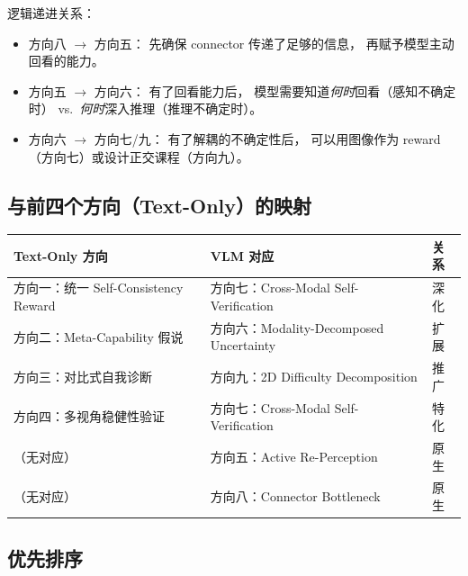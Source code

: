 \documentclass[12pt,a4paper]{article}
\begin{document}
\noindent
逻辑递进关系：
\begin{itemize}[leftmargin=2em]
  \item 方向八 $\rightarrow$ 方向五：
    先确保 connector 传递了足够的信息，
    再赋予模型主动回看的能力。
  \item 方向五 $\rightarrow$ 方向六：
    有了回看能力后，
    模型需要知道\textit{何时}回看（感知不确定时）
    vs.\ \textit{何时}深入推理（推理不确定时）。
  \item 方向六 $\rightarrow$ 方向七/九：
    有了解耦的不确定性后，
    可以用图像作为 reward（方向七）或设计正交课程（方向九）。
\end{itemize}

\subsection*{与前四个方向（Text-Only）的映射}

\begin{table}[h]
\centering
\small
\begin{tabular}{p{5cm}p{5.5cm}p{2cm}}
\toprule
\textbf{Text-Only 方向} & \textbf{VLM 对应} & \textbf{关系} \\
\midrule
方向一：统一 Self-Consistency Reward
  & 方向七：Cross-Modal Self-Verification
  & 深化 \\
方向二：Meta-Capability 假说
  & 方向六：Modality-Decomposed Uncertainty
  & 扩展 \\
方向三：对比式自我诊断
  & 方向九：2D Difficulty Decomposition
  & 推广 \\
方向四：多视角稳健性验证
  & 方向七：Cross-Modal Self-Verification
  & 特化 \\
（无对应）
  & 方向五：Active Re-Perception
  & 原生 \\
（无对应）
  & 方向八：Connector Bottleneck
  & 原生 \\
\bottomrule
\end{tabular}
\end{table}

\subsection*{优先排序}
\end{document}
